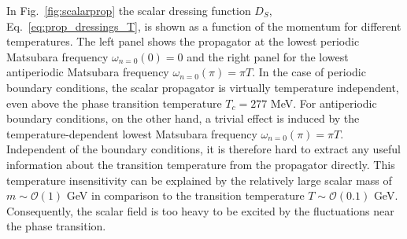 \documentclass[final,twocolumn,merge,sort&compress]{elsarticle}
\newcommand{\Tc}{\ensuremath{T_c}}
\begin{document}
In Fig.~\ref{fig:scalarprop} the scalar dressing function $D_S$,
Eq.~\eqref{eq:prop_dressings_T}, is shown as a function of the
momentum for different temperatures. The left panel shows the
propagator at the lowest periodic Matsubara frequency
$\omega_{n=0} (0)= 0$ and the right panel for the lowest antiperiodic
Matsubara frequency $\omega_{n=0}(\pi) = \pi T$.  In the case of
periodic boundary conditions, the scalar propagator is virtually
temperature independent, even above the phase transition temperature
$\Tc=277$ MeV.  For antiperiodic boundary conditions, on the other
hand, a trivial effect is induced by the temperature-dependent lowest
Matsubara frequency $\omega_{n=0} (\pi)= \pi T$.  Independent of the
boundary conditions, it is therefore hard to extract any useful
information about the transition temperature from the propagator
directly. This temperature insensitivity can be explained by the
relatively large scalar mass of $m \sim \mathcal{O}(1)$ GeV in
comparison to the transition temperature $T \sim \mathcal{O}(0.1)$
GeV.  Consequently, the scalar field is too heavy to be excited by the
fluctuations near the phase transition.
\end{document}

